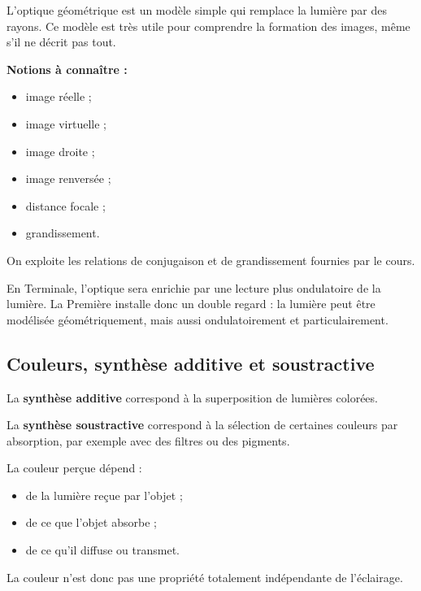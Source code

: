 \documentclass[11pt,a4paper]{article}
\begin{document}
\begin{sensbox}
L'optique géométrique est un modèle simple qui remplace la lumière par des rayons.  
Ce modèle est très utile pour comprendre la formation des images, même s'il ne décrit pas tout.
\end{sensbox}

\textbf{Notions à connaître :}
\begin{itemize}
    \item image réelle ;
    \item image virtuelle ;
    \item image droite ;
    \item image renversée ;
    \item distance focale ;
    \item grandissement.
\end{itemize}

\begin{proprbox}
On exploite les relations de conjugaison et de grandissement fournies par le cours.
\end{proprbox}

\begin{terminalebox}
En Terminale, l'optique sera enrichie par une lecture plus ondulatoire de la lumière.  
La Première installe donc un double regard : la lumière peut être modélisée géométriquement, mais aussi ondulatoirement et particulairement.
\end{terminalebox}

\subsection{Couleurs, synthèse additive et soustractive}

\begin{definitionbox}
La \textbf{synthèse additive} correspond à la superposition de lumières colorées.
\end{definitionbox}

\begin{definitionbox}
La \textbf{synthèse soustractive} correspond à la sélection de certaines couleurs par absorption, par exemple avec des filtres ou des pigments.
\end{definitionbox}

\begin{sensbox}
La couleur perçue dépend :
\begin{itemize}
    \item de la lumière reçue par l'objet ;
    \item de ce que l'objet absorbe ;
    \item de ce qu'il diffuse ou transmet.
\end{itemize}
La couleur n'est donc pas une propriété totalement indépendante de l'éclairage.
\end{sensbox}
\end{document}
